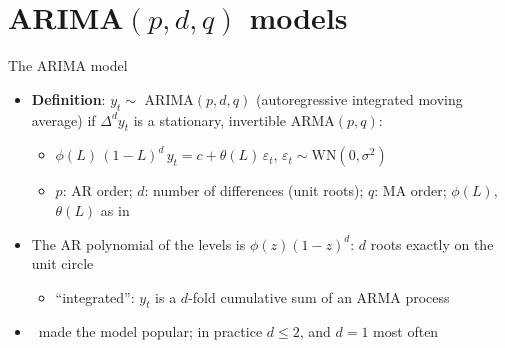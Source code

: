 \section{ARIMA$(p,d,q)$ models}

\begin{frame}{The ARIMA model}
\itemsize{\small}
\begin{itemize}
    \item \textbf{Definition}: $y_t \sim$ ARIMA$(p,d,q)$ (autoregressive integrated moving average) if $\Delta^d y_t$ is a stationary, invertible ARMA$(p,q)$:
    \begin{itemize}
        \item $\phi(L)\,(1 - L)^d\,y_t = c + \theta(L)\,\varepsilon_t$, $\varepsilon_t \sim \mathrm{WN}(0, \sigma^2)$
        \item $p$: AR order; $d$: number of differences (unit roots); $q$: MA order; $\phi(L)$, $\theta(L)$ as in 
    \end{itemize}
    \item The AR polynomial of the levels is $\phi(z)(1 - z)^d$: $d$ roots exactly on the unit circle
    \begin{itemize}
        \item ``integrated'': $y_t$ is a $d$-fold cumulative sum of an ARMA process
    \end{itemize}
    \item {}\ made the model popular; in practice $d \le 2$, and $d = 1$ most often
\end{itemize}
\end{frame}

